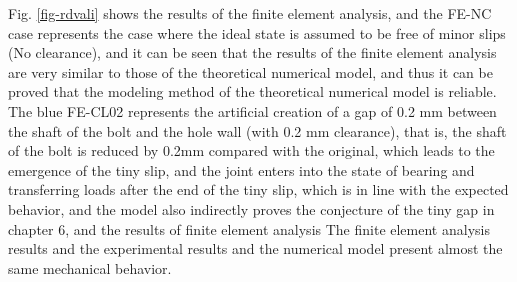 Fig. \ref{fig-rdvali} shows the results of the finite element analysis, and the FE-NC case represents the case where the ideal state is assumed to be free of minor slips (No clearance), and it can be seen that the results of the finite element analysis are very similar to those of the theoretical numerical model, and thus it can be proved that the modeling method of the theoretical numerical model is reliable. The blue FE-CL02 represents the artificial creation of a gap of 0.2 mm between the shaft of the bolt and the hole wall (with 0.2 mm clearance), that is, the shaft of the bolt is reduced by 0.2mm compared with the original, which leads to the emergence of the tiny slip, and the joint enters into the state of bearing and transferring loads after the end of the tiny slip, which is in line with the expected behavior, and the model also indirectly proves the conjecture of the tiny gap in chapter 6, and the results of finite element analysis The finite element analysis results and the experimental results and the numerical model present almost the same mechanical behavior.